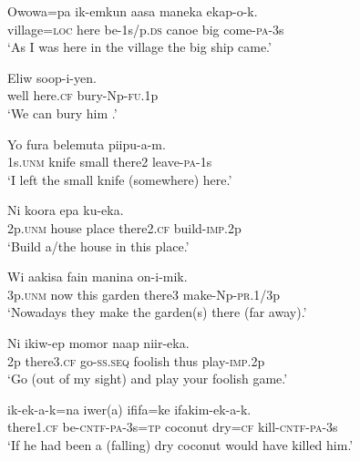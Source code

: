 \ea%
\label{ex:3:x463}
\gll Owowa=pa  ik-emkun aasa maneka ekap-o-k. \\
village=\textsc{loc} here be-1s/p.\textsc{ds} canoe big come-\textsc{pa}-3s\\
\glt`As I was here in the village the big ship came.'
\z

\ea%
\label{ex:3:x464}
\gll Eliw  soop-i-yen. \\
well here.\textsc{cf} bury-Np-\textsc{fu}.1p\\
\glt`We can bury him .'
\z

\ea%
\label{ex:3:x1213}
\gll Yo fura belemuta  piipu-a-m. \\
1s.\textsc{unm} knife small there2 leave-\textsc{pa}-1s\\
\glt`I left the small knife (somewhere) here.'
\z

\ea%
\label{ex:3:x465}
\gll Ni koora epa  ku-eka. \\
2p.\textsc{unm} house place there2.\textsc{cf} build-\textsc{imp}.2p\\
\glt`Build a/the house  in this place.'
\z

\ea%
\label{ex:3:x1214}
\gll Wi aakisa fain manina  on-i-mik. \\
3p.\textsc{unm} now this garden there3 make-Np-\textsc{pr}.1/3p\\
\glt`Nowadays they make the garden(s) there (far away).'
\z

\ea%
\label{ex:3:x1573}
\gll Ni  ikiw-ep momor naap niir-eka. \\
2p there3.\textsc{cf} go-\textsc{ss}.\textsc{seq} foolish thus play-\textsc{imp}.2p\\
\glt`Go  (out of my sight) and play your foolish game.'
\z

\ea%
\label{ex:3:x466}
\gll {} ik-ek-a-k=na iwer(a) ififa=ke ifakim-ek-a-k. \\
there1.\textsc{cf} be-\textsc{cntf}-\textsc{pa}-3s=\textsc{tp} coconut dry=\textsc{cf} kill-\textsc{cntf}-\textsc{pa}-3s\\
\glt`If he had been  a (falling) dry coconut would have killed him.'
\z

